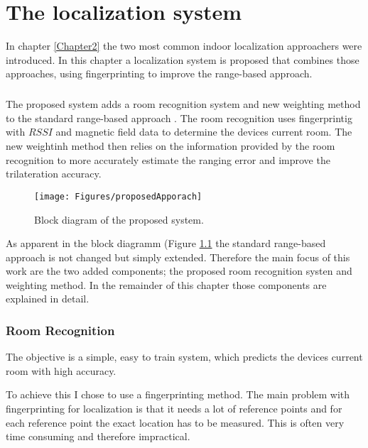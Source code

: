 \chapter{The localization system}

\label{Chapter3}

In chapter \ref{Chapter2} the two most common indoor localization approachers were introduced. In this chapter a localization system is proposed that combines those approaches, using fingerprinting to improve the range-based approach.

\paragraph{}The proposed system adds a room recognition system and new weighting method to the standard range-based approach . The room recognition uses fingerprintig with $RSSI$ and magnetic field data to determine the devices current room. The new weightinh method then relies on the information provided by the room recognition to more accurately estimate the ranging error and improve the trilateration accuracy.

\begin{figure}[ht]
\centering
\texttt{[image: Figures/proposedApporach]}
\decoRule
\caption[The proposed approach]{Block diagram of the proposed system.}
\label{fig:proposedApproach}
\end{figure}

As apparent in the block diagramm (Figure \ref{fig:proposedApproach} the standard range-based approach is not changed but simply extended. Therefore the main focus of this work are the two added components; the proposed room recognition systen and weighting method. In the remainder of this chapter those components are explained in detail. 

\subsection{Room Recognition}
The objective is a simple, easy to train system, which predicts the devices current room with high accuracy.

To achieve this I chose to use a fingerprinting method. The main problem with fingerprinting for  localization is that it needs a lot of reference points and for each reference point the exact location has to be measured. This is often very time consuming and therefore impractical.

